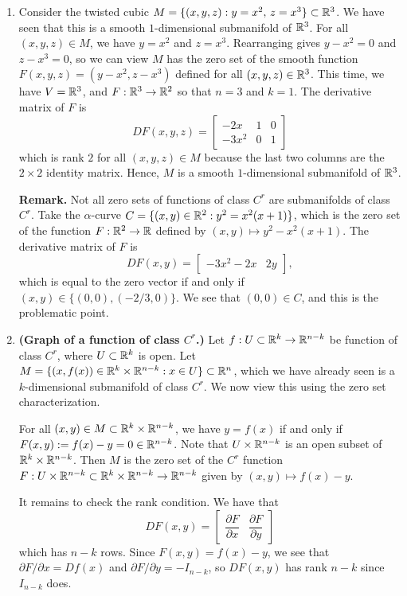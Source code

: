 \begin{enumerate}[(1)]
    \item Consider the twisted cubic $M = \{(x, y, z) : y = x^2,\, z = x^3\} \subset \mathbb{R}^3$.
    We have seen that this is a smooth $1$-dimensional submanifold of $\mathbb{R}^3$. 
    For all $(x, y, z) \in M$, we have $y = x^2$ and $z = x^3$. Rearranging 
    gives $y - x^2 = 0$ and $z - x^3 = 0$, so we can view $M$ has the zero 
    set of the smooth function $F(x, y, z) = (y-x^2, z-x^3)$ defined for all 
    $(x, y, z) \in \mathbb{R}^3$. This time, we have $V = \mathbb{R}^3$, and $F : 
    \mathbb{R}^3 \to \mathbb{R}^2$ so that $n = 3$ and $k = 1$. The derivative matrix of $F$ is 
    \[ DF(x, y, z) = \begin{bmatrix} 
        -2x & 1 & 0 \\ 
        -3x^2 & 0 & 1 
    \end{bmatrix} \] 
    which is rank $2$ for all $(x, y, z) \in M$ because the last two columns 
    are the $2 \times 2$ identity matrix. Hence, $M$ is a smooth $1$-dimensional 
    submanifold of $\mathbb{R}^3$.     

    {\bf Remark.} Not all zero sets of functions of class $C^r$ are submanifolds 
    of class $C^r$. Take the $\alpha$-curve $C = \{(x, y) \in \mathbb{R}^2 : y^2 = 
    x^2(x+1)\}$, which is the zero set of the function 
    $F : \mathbb{R}^2 \to \mathbb{R}$ defined by $(x, y) \mapsto y^2 - x^2(x+1)$. 
    The derivative matrix of $F$ is 
    \[ DF(x, y) = \begin{bmatrix} -3x^2 - 2x & 2y \end{bmatrix}, \] 
    which is equal to the zero vector if and only if $(x, y) \in 
    \{(0, 0), (-2/3, 0)\}$. We see that $(0, 0) \in C$, and this 
    is the problematic point. 

    \item {\bf (Graph of a function of class $C^r$.)} Let $f : U \subset \mathbb{R}^k 
    \to \mathbb{R}^{n-k}$ be function of class $C^r$, where $U \subset \mathbb{R}^k$ is open. 
    Let $M = \{(x, f(x)) \in \mathbb{R}^k \times \mathbb{R}^{n-k} : x \in U\} \subset \mathbb{R}^n$,
    which we have already seen is a $k$-dimensional submanifold of class $C^r$. 
    We now view this using the zero set characterization. 

    For all $(x, y) \in M \subset \mathbb{R}^k \times \mathbb{R}^{n-k}$, we have 
    $y = f(x)$ if and only if $F(x, y) := f(x) - y = 0 \in \mathbb{R}^{n-k}$.
    Note that $U \times \mathbb{R}^{n-k}$ is an open subset of $\mathbb{R}^k \times \mathbb{R}^{n-k}$. 
    Then $M$ is the zero set of the $C^r$ function $F : U \times \mathbb{R}^{n-k} 
    \subset \mathbb{R}^k \times \mathbb{R}^{n-k} \to \mathbb{R}^{n-k}$ given by $(x, y) \mapsto f(x) - y$.

    It remains to check the rank condition. We have that 
    \[ DF(x, y) = \left[ \begin{array}{c|c} 
        \dfrac{\partial F}{\partial x} & \dfrac{\partial F}{\partial y} 
    \end{array} \right] \]
    which has $n-k$ rows. Since $F(x, y) = f(x) - y$, we see that 
    $\partial F/\partial x = Df(x)$ and $\partial F/\partial y = -I_{n-k}$, 
    so $DF(x, y)$ has rank $n-k$ since $I_{n-k}$ does. 
\end{enumerate}

